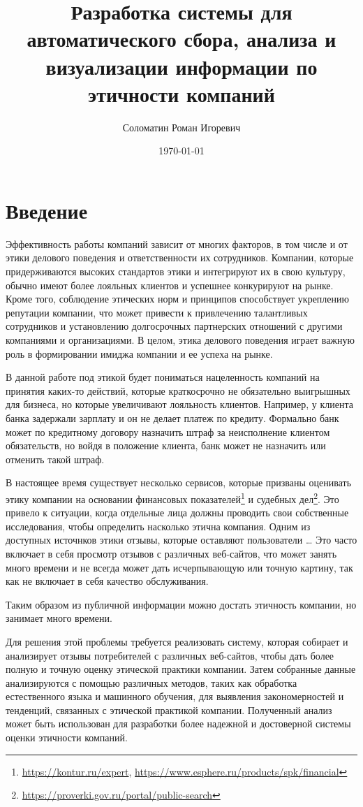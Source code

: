 \documentclass[PI, VKR]{HSEUniversity}
\author{Соломатин Роман Игоревич}
\date{\today}
\title{Разработка системы для автоматического сбора, анализа и визуализации информации по этичности компаний}
\begin{document}
\maketitle

\chapter*{Введение}
\label{sec:org50cf166}
Эффективность работы компаний зависит от многих факторов, в том числе и от этики делового поведения и ответственности их сотрудников. Компании, которые придерживаются высоких стандартов этики и интегрируют их в свою культуру, обычно имеют более лояльных клиентов и успешнее конкурируют на рынке. Кроме того, соблюдение этических норм и принципов способствует укреплению репутации компании, что может привести к привлечению талантливых сотрудников и установлению долгосрочных партнерских отношений с другими компаниями и организациями. В целом, этика делового поведения играет важную роль в формировании имиджа компании и ее успеха на рынке.

В данной работе под этикой будет пониматься нацеленность компаний на принятия каких-то действий, которые краткосрочно не обязательно выигрышных для бизнеса, но которые увеличивают лояльность клиентов. Например, у клиента банка задержали зарплату и он не делает платеж по кредиту. Формально банк может по кредитному договору назначить штраф за неисполнение клиентом обязательств, но войдя в положение клиента, банк может не назначить или отменить такой штраф.

В настоящее время существует несколько сервисов, которые призваны оценивать этику компании на основании финансовых показателей\footnote{\url{https://kontur.ru/expert}, \url{https://www.esphere.ru/products/spk/financial}} и судебных дел\footnote{\url{https://proverki.gov.ru/portal/public-search}}. Это привело к ситуации, когда отдельные лица должны проводить свои собственные исследования, чтобы определить насколько этична компания. Одним из доступных источнков этики отзывы, которые оставляют пользователи \ldots{} Это часто включает в себя просмотр отзывов с различных веб-сайтов, что может занять много времени и не всегда может дать исчерпывающую или точную картину, так как не включает в себя качество обслуживания.

Таким образом из публичной информации можно достать этичность компании, но занимает много времени.

Для решения этой проблемы требуется реализовать систему, которая собирает и анализирует отзывы потребителей с различных веб-сайтов, чтобы дать более полную и точную оценку этической практики компании. Затем собранные данные анализируются с помощью различных методов, таких как обработка естественного языка и машинного обучения, для выявления закономерностей и тенденций, связанных с этической практикой компании. Полученный анализ может быть использован для разработки более надежной и достоверной системы оценки этичности компаний.
\end{document}
